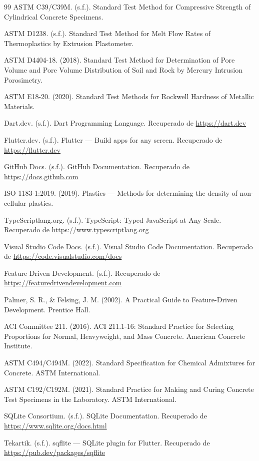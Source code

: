 \documentclass[12pt, letterpaper]{article}
\begin{document}
\begin{thebibliography}{99}
ASTM C39/C39M. (s.f.). Standard Test Method for Compressive Strength of Cylindrical Concrete Specimens.

ASTM D1238. (s.f.). Standard Test Method for Melt Flow Rates of Thermoplastics by Extrusion Plastometer.

ASTM D4404-18. (2018). Standard Test Method for Determination of Pore Volume and Pore Volume Distribution of Soil and Rock by Mercury Intrusion Porosimetry.

ASTM E18-20. (2020). Standard Test Methods for Rockwell Hardness of Metallic Materials.

Dart.dev. (s.f.). Dart Programming Language. Recuperado de \url{https://dart.dev}

Flutter.dev. (s.f.). Flutter — Build apps for any screen. Recuperado de \url{https://flutter.dev}

GitHub Docs. (s.f.). GitHub Documentation. Recuperado de \url{https://docs.github.com}

ISO 1183-1:2019. (2019). Plastics — Methods for determining the density of non-cellular plastics.

TypeScriptlang.org. (s.f.). TypeScript: Typed JavaScript at Any Scale. Recuperado de \url{https://www.typescriptlang.org}

Visual Studio Code Docs. (s.f.). Visual Studio Code Documentation. Recuperado de \url{https://code.visualstudio.com/docs}

Feature Driven Development. (s.f.). Recuperado de \url{https://featuredrivendevelopment.com}

Palmer, S. R., \& Felsing, J. M. (2002).
A Practical Guide to Feature-Driven Development.
Prentice Hall.

ACI Committee 211. (2016).
ACI 211.1-16: Standard Practice for Selecting Proportions for Normal, Heavyweight, and Mass Concrete.
American Concrete Institute.

ASTM C494/C494M. (2022).
Standard Specification for Chemical Admixtures for Concrete.
ASTM International.

ASTM C192/C192M. (2021).
Standard Practice for Making and Curing Concrete Test Specimens in the Laboratory.
ASTM International.

SQLite Consortium. (s.f.). SQLite Documentation. Recuperado de \url{https://www.sqlite.org/docs.html}

Tekartik. (s.f.). sqflite — SQLite plugin for Flutter. Recuperado de \url{https://pub.dev/packages/sqflite}

\end{thebibliography}
\end{document}
